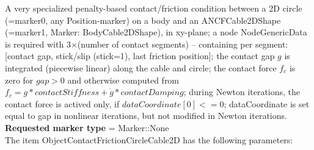A very specialized penalty-based contact/friction condition between a 2D circle (=marker0, any Position-marker) on a body and an ANCFCable2DShape (=marker1, Marker: BodyCable2DShape), in xy-plane; a node NodeGenericData is required with 3$\times$(number of contact segments) -- containing per segment: [contact gap, stick/slip (stick=1), last friction position]; the contact gap $g$ is integrated (piecewise linear) along the cable and circle; the contact force $f_c$ is zero for $gap>0$ and otherwise computed from $f_c = g*contactStiffness + \dot g*contactDamping$; during Newton iterations, the contact force is actived only, if $dataCoordinate[0] <= 0$; dataCoordinate is set equal to gap in nonlinear iterations, but not modified in Newton iterations.
 \\  {\bf Requested marker type} = Marker::None \\ 
The item ObjectContactFrictionCircleCable2D has the following parameters:
